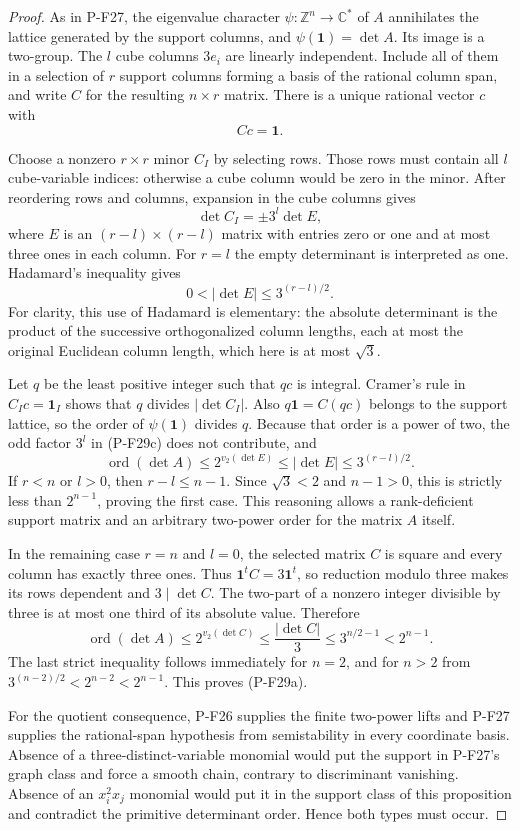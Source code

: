 \documentclass[11pt,a4paper]{article}
\begin{document}
\begin{proof}
As in P-F27, the eigenvalue character
$\psi:\mathbb Z^n\to\mathbb C^*$ of $A$ annihilates
the lattice generated by the support columns, and
$\psi(\mathbf1)=\det A$. Its image is a two-group.
The $l$ cube columns $3e_i$ are linearly independent.
Include all of them in a selection of $r$ support columns
forming a basis of the rational column span, and write
$C$ for the resulting $n\times r$ matrix. There is a
unique rational vector $c$ with
\[
 Cc=\mathbf1.
 \tag{P-F29b}
\]

Choose a nonzero $r\times r$ minor $C_I$ by selecting
rows. Those rows must contain all $l$ cube-variable
indices: otherwise a cube column would be zero in the
minor. After reordering rows and columns, expansion in
the cube columns gives
\[
 \det C_I=\pm3^l\det E,
 \tag{P-F29c}
\]
where $E$ is an $(r-l)\times(r-l)$ matrix with entries
zero or one and at most three ones in each column.
For $r=l$ the empty determinant is interpreted as one.
Hadamard's inequality gives
\[
 0<|\det E|\le3^{(r-l)/2}.
 \tag{P-F29d}
\]
For clarity, this use of Hadamard is elementary: the
absolute determinant is the product of the successive
orthogonalized column lengths, each at most the original
Euclidean column length, which here is at most $\sqrt3$.

Let $q$ be the least positive integer such that $qc$ is
integral. Cramer's rule in $C_Ic=\mathbf1_I$ shows that
$q$ divides $|\det C_I|$. Also
$q\mathbf1=C(qc)$ belongs to the support lattice, so
the order of $\psi(\mathbf1)$ divides $q$.
Because that order is a power of two, the odd factor
$3^l$ in (P-F29c) does not contribute, and
\[
 \operatorname{ord}(\det A)
       \le 2^{v_2(\det E)}
       \le |\det E|\le3^{(r-l)/2}.
 \tag{P-F29e}
\]
If $r<n$ or $l>0$, then $r-l\le n-1$.
Since $\sqrt3<2$ and $n-1>0$, this is strictly less
than $2^{n-1}$, proving the first case. This reasoning
allows a rank-deficient support matrix and an arbitrary
two-power order for the matrix $A$ itself.

In the remaining case $r=n$ and $l=0$, the selected
matrix $C$ is square and every column has exactly three
ones. Thus
$\mathbf1^tC=3\mathbf1^t$, so reduction modulo three
makes its rows dependent and $3\mid\det C$.
The two-part of a nonzero integer divisible by three
is at most one third of its absolute value. Therefore
\[
 \operatorname{ord}(\det A)
    \le 2^{v_2(\det C)}
    \le\frac{|\det C|}{3}
    \le3^{n/2-1}<2^{n-1}.
 \tag{P-F29f}
\]
The last strict inequality follows immediately for
$n=2$, and for $n>2$ from
$3^{(n-2)/2}<2^{n-2}<2^{n-1}$.
This proves (P-F29a).

For the quotient consequence, P-F26 supplies the finite
two-power lifts and P-F27 supplies the rational-span
hypothesis from semistability in every coordinate basis.
Absence of a three-distinct-variable monomial would put
the support in P-F27's graph class and force a smooth
chain, contrary to discriminant vanishing. Absence of
an $x_i^2x_j$ monomial would put it in the support class
of this proposition and contradict the primitive
determinant order. Hence both types must occur.
\end{proof}
\end{document}
